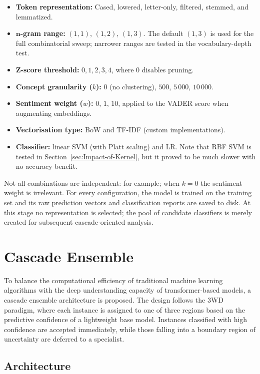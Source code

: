 \documentclass[a4paper,twoside,12pt]{book}
\newcommand{\zscore}{Z}
\newcommand{\logreg}{LR}
\newcommand{\kconcepts}{k}
\newcommand{\weightparam}{w}
\begin{document}
\begin{itemize}
	\item \textbf{Token representation:} Cased, lowered, letter-only, filtered, stemmed, and lemmatized.
	\item \textbf{$\boldsymbol{n}$-gram range:} $(1,1)$, $(1,2)$, $(1,3)$. The default $(1,3)$ is used for the full combinatorial sweep; narrower ranges are tested in the vocabulary-depth test.
	\item \textbf{$\mathbf{\zscore}$-score threshold:} $0,1,2,3,4$, where $0$ disables pruning.
	\item \textbf{Concept granularity ($k$):} $0$ (no clustering), $500$, $5\,000$, $10\,000$.
	\item \textbf{Sentiment weight ($\weightparam$):} $0$, $1$, $10$, applied to the VADER score when augmenting embeddings.
	\item \textbf{Vectorisation type:} BoW and TF-IDF (custom implementations).
	\item \textbf{Classifier:} linear SVM (with Platt scaling) and \logreg{}. Note that RBF SVM is tested in Section~\ref{sec:Impact-of-Kernel}, but it proved to be much slower with no accuracy benefit.
\end{itemize}
Not all combinations are independent: for example; when $\kconcepts=0$ the sentiment weight is irrelevant. For every configuration, the model is trained on the training set and its raw prediction vectors and classification reports are saved to disk. At this stage no representation is selected; the pool of candidate classifiers is merely created for subsequent cascade-oriented analysis. 

\section{Cascade Ensemble} \label{sec:cascade}

To balance the computational efficiency of traditional machine learning algorithms with the deep understanding capacity of transformer-based models, a cascade ensemble architecture is proposed. The design follows the 3WD paradigm, where each instance is assigned to one of three regions based on the predictive confidence of a lightweight base model. Instances classified with high confidence are accepted immediately, while those falling into a boundary region of uncertainty are deferred to a specialist.

\subsection{Architecture} \label{sec:cascade_architecture}
\end{document}
